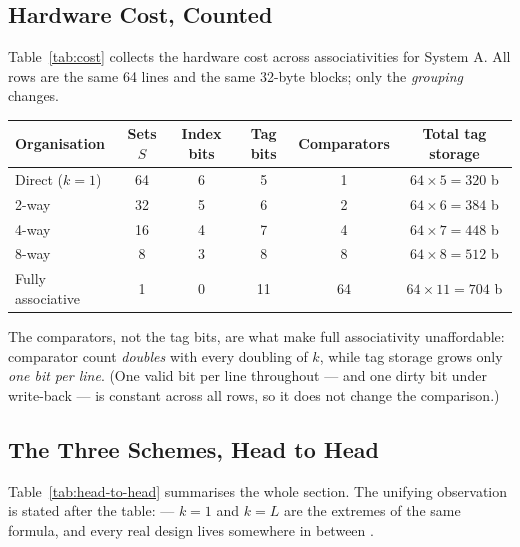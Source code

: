 \documentclass[11pt]{article}
\begin{document}
\subsection{Hardware Cost, Counted}

Table~\ref{tab:cost} collects the hardware cost across associativities for System A. All rows are the same 64 lines and the same 32-byte blocks; only the \emph{grouping} changes.

\begin{center}
\footnotesize
\begin{tabular}{@{}lccccc@{}}
  \toprule
  \textbf{Organisation} & \textbf{Sets $S$} & \textbf{Index bits} &
  \textbf{Tag bits} & \textbf{Comparators} & \textbf{Total tag storage} \\
  \midrule
  Direct ($k{=}1$)      & 64 & 6 & 5  & 1  & $64\times5 = 320$ b \\
  2-way                 & 32 & 5 & 6  & 2  & $64\times6 = 384$ b \\
  4-way                 & 16 & 4 & 7  & 4  & $64\times7 = 448$ b \\
  8-way                 & 8  & 3 & 8  & 8  & $64\times8 = 512$ b \\
  Fully associative     & 1  & 0 & 11 & 64 & $64\times11 = 704$ b \\
  \bottomrule
\end{tabular}
\label{tab:cost}
\end{center}

The comparators, not the tag bits, are what make full associativity unaffordable: comparator count \emph{doubles} with every doubling of $k$, while tag storage grows only \emph{one bit per line}. (One valid bit per line throughout --- and one dirty bit under write-back --- is constant across all rows, so it does not change the comparison.)

\subsection{The Three Schemes, Head to Head}

Table~\ref{tab:head-to-head} summarises the whole section. The unifying observation is stated after the table:  --- $k = 1$ and $k = L$ are the extremes of the same formula, and every real design lives somewhere in between \cite[\S5.2, PDF pp.~187--203]{Stallings2015_computer_organization}.
\end{document}
